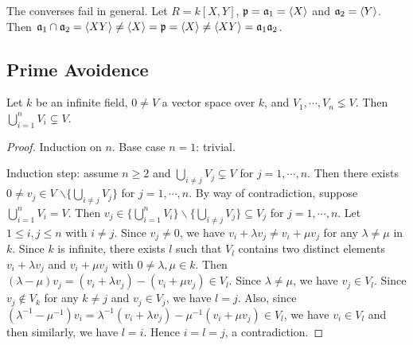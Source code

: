 \begin{example*}
    The converses fail in general. Let $R = k[X,Y]$, $\mathfrak{p} = \mathfrak{a}_1 = \langle X \rangle$ and $\mathfrak{a}_2 = \langle Y \rangle$. Then $\mathfrak{a}_1 \cap \mathfrak{a}_2 = \langle XY \rangle \neq \langle X \rangle = \mathfrak{p} = \langle X \rangle \neq  \langle XY \rangle = \mathfrak{a}_1\mathfrak{a}_2$.
\end{example*}

\subsection*{Prime Avoidence}

\begin{lemma}\label{1.48}
    Let $k$ be an infinite field, $0 \neq V$ a vector space over $k$, and $V_1,\cdots,V_n \lneq V$. Then $\bigcup_{i=1}^n V_i \subsetneq V$.
\end{lemma}

\begin{proof}
    Induction on $n$. Base case $n = 1$: trivial. \par
    Induction step: assume $n \geq 2$ and $\bigcup_{i \neq j}V_j \subsetneq V$ for $j = 1,\cdots,n$. Then there exists $0 \neq v_j \in V$ $\smallsetminus \{\bigcup_{i \neq j}V_j\}$ for $j = 1,\cdots,n$. By way of contradiction, suppose $\bigcup_{i=1}^nV_i = V$. Then $v_j \in \{\bigcup_{i=1}^n V_i\} \smallsetminus \{\bigcup_{i \neq j}V_j\} \subseteq V_j$ for $j = 1,\cdots,n$. Let $1 \leq i,j \leq n$ with $i \neq j$. Since $v_j \neq 0$, we have $v_i + \lambda v_j \neq v_i + \mu v_j$ for any $\lambda \neq \mu$ in $k$. Since $k$ is infinite, there exists $l$ such that $V_l$ contains two distinct elements $v_i + \lambda v_j$ and $v_i + \mu v_j$ with $0 \neq \lambda, \mu \in k$. Then $(\lambda-\mu)v_j = (v_i + \lambda v_j) - (v_i + \mu v_j) \in V_l$. Since $\lambda \neq \mu$, we have $v_j \in V_l$. Since $v_j \not \in V_k$ for any $k \neq j$ and $v_j \in V_j$, we have $l = j$. Also, since $(\lambda^{-1}-\mu^{-1})v_i = \lambda^{-1}(v_i + \lambda v_j) - \mu^{-1}(v_i + \mu v_j) \in V_l$, we have $v_i \in V_l$ and then similarly, we have $l=i$. Hence $i = l = j$, a contradiction.
\end{proof}

